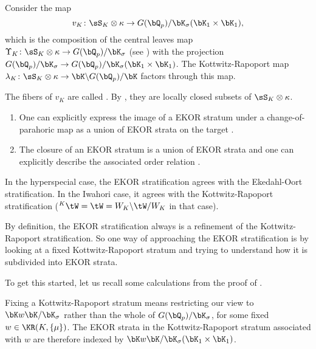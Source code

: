 \documentclass[a4paper]{scrartcl} %
\numberwithin{equation}{section}
\begin{document}
Consider the map
\begin{equation*}
  v_K\colon \sS_K\otimes\kappa\to G(\bQ_p)/\bK_\sigma(\bK_1\times\bK_1),
\end{equation*}
which is the composition of the central leaves map $\Upsilon_K\colon \sS_K\otimes\kappa\to G(\bQ_p)/\bK_\sigma$ (see \cite{article-leaves}) with the projection $G(\bQ_p)/\bK_\sigma\to G(\bQ_p)/\bK_\sigma(\bK_1\times\bK_1)$. The Kottwitz-Rapoport map $\lambda_K\colon {\sS_K\otimes\kappa} \to \bK\backslash G(\bQ_p)/\bK$ factors through this map.

The fibers of $v_K$ are called . By \cite[Thm.~6.15]{he-rapo}, they are locally closed subsets of $\sS_K\otimes\kappa$.

\begin{Remarks}
  \begin{enumerate}[(1)]
  \item One can explicitly express the image of a EKOR stratum under a change-of-parahoric map as a union of EKOR strata on the target \cite[Prop.~6.11]{he-rapo}.
  \item The closure of an EKOR stratum is a union of EKOR strata and one can explicitly describe the associated order relation \cite[Thm.~6.15]{he-rapo}.
  \end{enumerate}
\end{Remarks}

\begin{Remark}\label{ekor-interpoliert}
  In the hyperspecial case, the EKOR stratification agrees with the Ekedahl-Oort stratification. In the Iwahori case, it agrees with the Kottwitz-Rapoport stratification ($^K\tW=\tW=W_K\backslash \tW/W_K$ in that case).
\end{Remark}

By definition, the EKOR stratification always is a refinement of the Kottwitz-Rapoport stratification.  So one way of approaching the EKOR stratification is by looking at a fixed Kottwitz-Rapoport stratum and trying to understand how it is subdivided into EKOR strata.

To get this started, let us recall some calculations from the proof of \cite[Thm.~6.1]{he-rapo}.

Fixing a Kottwitz-Rapoport stratum means restricting our view to $\bK w\bK/\bK_\sigma$ rather than the whole of $G(\bQ_p)/\bK_\sigma$, for some fixed $w\in\KR(K,\{\mu\})$. The EKOR strata in the Kottwitz-Rapoport stratum associated with $w$ are therefore indexed by $\bK w\bK/\bK_\sigma(\bK_1\times\bK_1)$.
\end{document}
